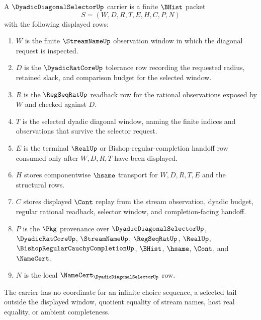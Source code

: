 \begin{definition}
\label{def:dyadic-diagonal-selector-carrier}
A $\DyadicDiagonalSelectorUp$ carrier is a finite $\BHist$ packet
$$
S=(W,D,R,T,E,H,C,P,N)
$$
with the following displayed rows:
\begin{enumerate}
\item $W$ is the finite $\StreamNameUp$ observation window in which the diagonal request is inspected.
\item $D$ is the $\DyadicRatCoreUp$ tolerance row recording the requested radius, retained slack, and comparison budget for the selected window.
\item $R$ is the $\RegSeqRatUp$ readback row for the rational observations exposed by $W$ and checked against $D$.
\item $T$ is the selected dyadic diagonal window, naming the finite indices and observations that survive the selector request.
\item $E$ is the terminal $\RealUp$ or Bishop-regular-completion handoff row consumed only after $W,D,R,T$ have been displayed.
\item $H$ stores componentwise $\hsame$ transport for $W,D,R,T,E$ and the structural rows.
\item $C$ stores displayed $\Cont$ replay from the stream observation, dyadic budget, regular rational readback, selector window, and completion-facing handoff.
\item $P$ is the $\Pkg$ provenance over $\DyadicDiagonalSelectorUp$, $\DyadicRatCoreUp$, $\StreamNameUp$, $\RegSeqRatUp$, $\RealUp$, $\BishopRegularCauchyCompletionUp$, $\BHist$, $\hsame$, $\Cont$, and $\NameCert$.
\item $N$ is the local $\NameCert_{\DyadicDiagonalSelectorUp}$ row.
\end{enumerate}
The carrier has no coordinate for an infinite choice sequence, a selected tail outside the displayed window, quotient equality of stream names, host real equality, or ambient completeness.
\end{definition}

